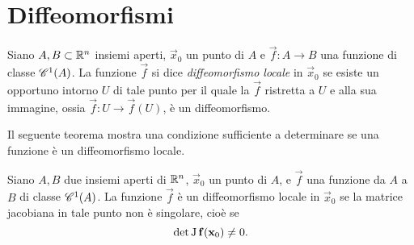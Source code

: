 \section{Diffeomorfismi}
\begin{definizione} \label{d:diffeomorfismo-locale}
	Siano $A,B\subset\R^n$ insiemi aperti, $\vec x_0$ un punto di $A$ e $\vec f\colon A\to B$ una funzione di classe $\cont[1]{A}$. La funzione $\vec f$ si dice \emph{diffeomorfismo locale} in $\vec x_0$ se esiste un opportuno intorno $U$ di tale punto per il quale la $\vec f$ ristretta a $U$ e alla sua immagine, ossia $\vec f\colon U\to \vec f(U)$, è un diffeomorfismo.
\end{definizione}
Il seguente teorema mostra una condizione sufficiente a determinare se una funzione è un diffeomorfismo locale.
\begin{teorema} \label{t:invertibilita-locale}
	Siano $A,B$ due insiemi aperti di $\R^n$, $\vec x_0$ un punto di $A$, e $\vec f$ una funzione da $A$ a $B$ di classe $\cont[1]{A}$.
	La funzione $\vec f$ è un diffeomorfismo locale in $\vec x_0$ se la matrice jacobiana in tale punto non è singolare, cioè se
	\begin{equation} 
		\det\jac\vec f(\vec x_0)\neq 0.
		\label{eq:invertibilita-locale-determinante-jacobiana}
	\end{equation}
\end{teorema}
